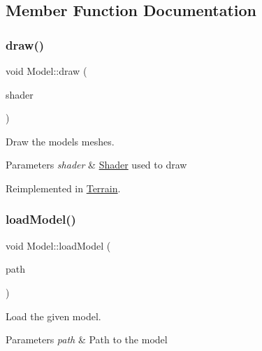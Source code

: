 \subsection{Member Function Documentation}
\mbox{\label{classModel_a125ff27c588f7f9acfc59c20dcc313b2}} 
\subsubsection{\texorpdfstring{draw()}{draw()}}
{\footnotesize\ttfamily void Model\+::draw (\begin{DoxyParamCaption}\item[{const \hyperlink{classShader}{Shader} \&}]{shader }\end{DoxyParamCaption})\hspace{0.3cm}{\ttfamily [virtual]}}



Draw the model\textquotesingle{}s meshes. 


\begin{DoxyParams}{Parameters}
{\em shader} & \hyperlink{classShader}{Shader} used to draw \\
\hline
\end{DoxyParams}


Reimplemented in \hyperlink{classTerrain_ac3a615c383f37e7fc9894d20cc090da2}{Terrain}.

\mbox{\label{classModel_a3d0a1ca0dc53b54cf5f6d956b156b7ec}} 
\subsubsection{\texorpdfstring{load\+Model()}{loadModel()}}
{\footnotesize\ttfamily void Model\+::load\+Model (\begin{DoxyParamCaption}\item[{const std\+::string \&}]{path }\end{DoxyParamCaption})\hspace{0.3cm}{\ttfamily [protected]}}



Load the given model. 


\begin{DoxyParams}{Parameters}
{\em path} & Path to the model \\
\hline
\end{DoxyParams}
\mbox{\label{classModel_a6c1d9003a9cb7699ba70b250c69d8ba4}} 
